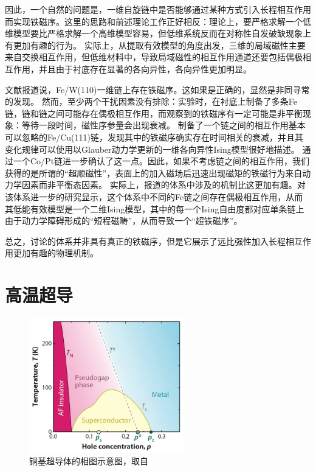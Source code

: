 \documentclass[hyperref, UTF8]{ctexart}
\begin{document}
因此，一个自然的问题是，一维自旋链中是否能够通过某种方式引入长程相互作用而实现铁磁序。这里的思路和前述理论工作正好相反：理论上，要严格求解一个低维模型要比严格求解一个高维模型容易，但低维系统反而在对称性自发破缺现象上有更加有趣的行为。
实际上，从提取有效模型的角度出发，三维的局域磁性主要来自交换相互作用，但低维材料中，导致局域磁性的相互作用通道还要包括偶极相互作用，并且由于衬底存在显著的各向异性，各向异性更加明显\cite{shen1997magnetism}。

文献\cite{PhysRevLett.73.898}报道说，Fe/W(110)一维链上存在铁磁序。这如果是正确的，显然是非同寻常的发现。
然而，至少两个干扰因素没有排除：实验时，在衬底上制备了多条Fe链，链和链之间可能存在偶极相互作用，而观察到的铁磁序有一定可能是非平衡现象：等待一段时间，磁性序参量会出现衰减。
\cite{shen1997magnetism}制备了一个链之间的相互作用基本可以忽略的Fe/Cu(111)链，发现其中的铁磁序确实存在时间相关的衰减，并且其变化规律可以使用以Glauber动力学更新的一维各向异性Ising模型很好地描述。
\cite{gambardella2002ferromagnetism}通过一个Co/Pt链进一步确认了这一点。因此，如果不考虑链之间的相互作用，我们获得的是所谓的“超顺磁性”，表面上的加入磁场后迅速出现磁矩的铁磁行为来自动力学因素而非平衡态因素。
实际上，\cite{PhysRevLett.73.898}报道的体系中涉及的机制比这更加有趣。对该体系进一步的研究\cite{PhysRevB.57.R677}显示，这个体系中不同的Fe链之间存在偶极相互作用，从而其低能有效模型是一个二维Ising模型，其中的每一个Ising自由度都对应单条链上由于动力学障碍形成的“短程磁畴”，从而导致一个“超铁磁序”。

总之，\cite{PhysRevLett.73.898}讨论的体系并非具有真正的铁磁序，但是它展示了远比强性加入长程相互作用更加有趣的物理机制。

\section{高温超导}

\begin{figure}
    \centering
    \includegraphics[width=0.6\textwidth]{phase-diagram-of-cuprate-superconductors.png}
    \caption{铜基超导体的相图示意图，取自\cite{cuprate-diagram}}
    \label{fig:cuprate}
\end{figure}
\end{document}
